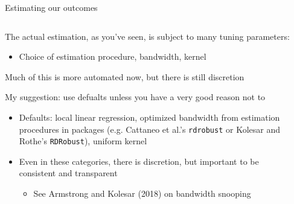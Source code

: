 \documentclass[notes,11pt, aspectratio=169]{beamer}
\newenvironment{wideitemize}{\itemize\addtolength{\itemsep}{10pt}}{\enditemize}
\begin{document}
\begin{frame}{Estimating our outcomes}
    \begin{columns}[onlytextwidth, T] %
      \begin{column}{.7\textwidth}
        \begin{wideitemize}
        \item The actual estimation, as you've seen, is subject to many tuning parameters:
          \begin{itemize}
          \item Choice of estimation procedure, bandwidth, kernel 
          \end{itemize}
        \item Much of this is more automated now, but there is still discretion
        \item My suggestion: use defualts unless you have a very good reason not to
          \begin{itemize}
          \item Defaults: local linear regression, optimized bandwidth
            from estimation procedures in packages (e.g. Cattaneo et
            al.'s \texttt{rdrobust} or Kolesar and Rothe's
            \texttt{RDRobust}), uniform kernel
          \item Even in these categories, there is discretion, but
            important to be consistent and transparent
            \begin{itemize}
            \item See Armstrong and Kolesar (2018) on bandwidth snooping
            \end{itemize}
          \end{itemize}
        \end{wideitemize}
      \end{column}%
      \hfill%
      \begin{column}{.3\textwidth}
      \end{column}%
    \end{columns}
\end{frame}
\end{document}
